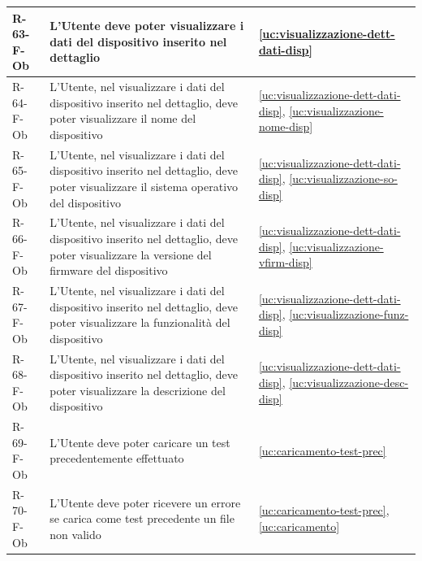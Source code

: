 ﻿\documentclass[a4paper,12pt]{article}
\begin{document}
{{\begin{longtable}{|l|p{}|p{}|}
            R-63-F-Ob       & L'Utente deve poter visualizzare i dati del dispositivo inserito nel dettaglio                                                                                                              & \ref{uc:visualizzazione-dett-dati-disp}                                               \\ \hline
            R-64-F-Ob       & L'Utente, nel visualizzare i dati del dispositivo inserito nel dettaglio, deve poter visualizzare il nome del dispositivo                                                                   & \ref{uc:visualizzazione-dett-dati-disp}, \ref{uc:visualizzazione-nome-disp}                 \\ \hline
            R-65-F-Ob       & L'Utente, nel visualizzare i dati del dispositivo inserito nel dettaglio, deve poter visualizzare il sistema operativo del dispositivo                                                      & \ref{uc:visualizzazione-dett-dati-disp}, \ref{uc:visualizzazione-so-disp}                 \\ \hline
            R-66-F-Ob       & L'Utente, nel visualizzare i dati del dispositivo inserito nel dettaglio, deve poter visualizzare la versione del firmware del dispositivo                                                  & \ref{uc:visualizzazione-dett-dati-disp}, \ref{uc:visualizzazione-vfirm-disp}                 \\ \hline
            R-67-F-Ob       & L'Utente, nel visualizzare i dati del dispositivo inserito nel dettaglio, deve poter visualizzare la funzionalità del dispositivo                                                           & \ref{uc:visualizzazione-dett-dati-disp}, \ref{uc:visualizzazione-funz-disp}                 \\ \hline
            R-68-F-Ob       & L'Utente, nel visualizzare i dati del dispositivo inserito nel dettaglio, deve poter visualizzare la descrizione del dispositivo                                                            & \ref{uc:visualizzazione-dett-dati-disp}, \ref{uc:visualizzazione-desc-disp}                 \\ \hline
            R-69-F-Ob       & L'Utente deve poter caricare un test precedentemente effettuato                                                                                                                             & \ref{uc:caricamento-test-prec}                                               \\ \hline
            R-70-F-Ob       & L'Utente deve poter ricevere un errore se carica come test precedente un file non valido                                                                                                    & \ref{uc:caricamento-test-prec}, \ref{uc:caricamento}                       \\ \hline

\end{longtable}}}
\end{document}
